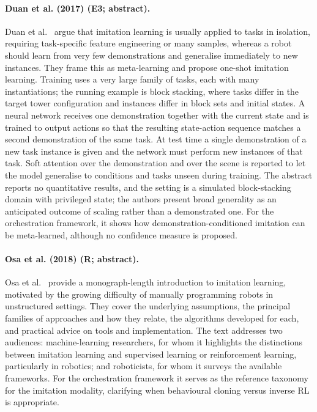\documentclass[10pt,a4paper]{article}
\begin{document}
\paragraph{Duan et al. (2017) (E3; abstract).} Duan et al.~\cite{Duan2017} argue that imitation learning is usually applied to tasks in isolation, requiring task-specific feature engineering or many samples, whereas a robot should learn from very few demonstrations and generalise immediately to new instances. They frame this as meta-learning and propose one-shot imitation learning. Training uses a very large family of tasks, each with many instantiations; the running example is block stacking, where tasks differ in the target tower configuration and instances differ in block sets and initial states. A neural network receives one demonstration together with the current state and is trained to output actions so that the resulting state-action sequence matches a second demonstration of the same task. At test time a single demonstration of a new task instance is given and the network must perform new instances of that task. Soft attention over the demonstration and over the scene is reported to let the model generalise to conditions and tasks unseen during training. The abstract reports no quantitative results, and the setting is a simulated block-stacking domain with privileged state; the authors present broad generality as an anticipated outcome of scaling rather than a demonstrated one. For the orchestration framework, it shows how demonstration-conditioned imitation can be meta-learned, although no confidence measure is proposed.

\paragraph{Osa et al. (2018) (R; abstract).} Osa et al.~\cite{Osa2018} provide a monograph-length introduction to imitation learning, motivated by the growing difficulty of manually programming robots in unstructured settings. They cover the underlying assumptions, the principal families of approaches and how they relate, the algorithms developed for each, and practical advice on tools and implementation. The text addresses two audiences: machine-learning researchers, for whom it highlights the distinctions between imitation learning and supervised learning or reinforcement learning, particularly in robotics; and roboticists, for whom it surveys the available frameworks. For the orchestration framework it serves as the reference taxonomy for the imitation modality, clarifying when behavioural cloning versus inverse RL is appropriate.
\end{document}
